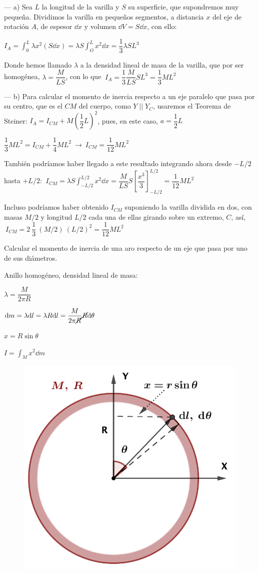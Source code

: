 --- a) Sea $L$ la longitud de la varilla y $S$ su superficie, que supondremos muy pequeña. Dividimos la varilla en pequeños segmentos, a distancia $x$ del eje de rotación $A$, de espesor $\dd x$ y volumen $\dd V=S\dd x$, con ello:

$\displaystyle I_A=\displaystyle \int_0^L \lambda x^2 (S\dd x)=\lambda S \int_O^L x^2 \dd x= \dfrac 1 3 \lambda S L^3$

Donde hemos llamado $\lambda$ a la densidad lineal de masa de la varilla, que por ser homogénea, $\lambda=\dfrac M{LS}$, con lo que
$\ I_A=\dfrac 1 3 \dfrac{M}{LS} SL^3=\dfrac 1 3 M L^2$

--- b) Para calcular el momento de inercia respecto a un eje paralelo que pasa por su centro, que es el $CM$ del cuerpo, como $Y\; || \; Y_C$, usaremos el Teorema de Steiner:
$I_A=I_{CM}+M\left( \dfrac 1 2 L \right)^2$, pues, en este caso, $a=\dfrac 1 2 L$ 

$\dfrac 1 3 M L^2=I_{CM}+\dfrac 1 4 M L^2 \ \to \ I_{CM}=\dfrac{1}{12}ML^2$

\textcolor{gris}{También podríamos haber llegado a este resultado integrando ahora desde $-L/2$ hasta $+L/2$: $\ \displaystyle I_{CM}=\lambda S \int_{-L/2}^{L/2}x^2 \dd x=\dfrac {M}{LS} S \left[ \dfrac {x^3}{3} \right]_{-L/2}^{L/2} = \dfrac {1}{12} ML^2$}

\textcolor{gris}{Incluso podríamos haber obtenido $I_{CM}$ suponiendo la varilla dividida en dos, con masas $M/2$ y longitud $L/2$ cada una de ellas girando sobre un extremo, $C$, así,
$\ I_{CM}=2\ \dfrac 1 3 \ (M/2)\ (L/2)^2 = \dfrac 1 {12} ML^2$}


\vspace{10mm} %
\begin{prob}
Calcular el momento de inercia de una aro respecto de un eje que pasa por uno de sus diámetros.	
\end{prob}

\begin{multicols}{2}
Anillo homogéneo, densidad lineal de masa:

$\lambda=\dfrac {M}{2\pi R}$

$ \dd m=\lambda \dd l=\lambda R\dd l =\dfrac {M}{2\pi \cancel{R}}\cancel{R}\dd \theta$

$x=R\sin \theta$

$I=\displaystyle \int_M x^2 \dd m$
\begin{figure}[H]
	\centering
	\includegraphics[width=.45\textwidth]{imagenes/imagenes16/T16IM15.png}
\end{figure}	
\end{multicols}

